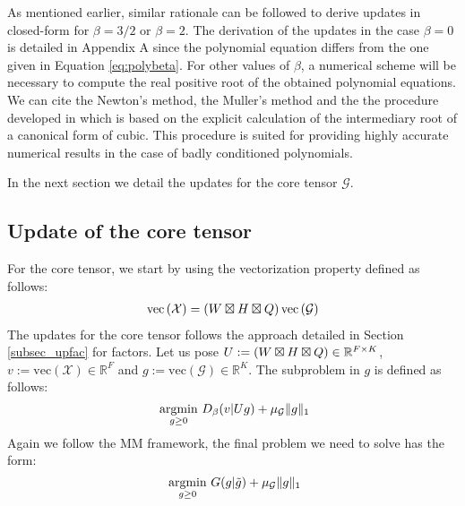 \documentclass[a4paper, 11pt]{article}
\begin{document}
As mentioned earlier, similar rationale can be followed to derive updates in closed-form for $\beta=3/2$ or $\beta=2$. 
The derivation of the updates in the case $\beta = 0$ is detailed in Appendix A since the polynomial equation differs from the one given in Equation \eqref{eq:polybeta}.
For other values of $\beta$, a numerical scheme will be necessary to compute the real positive root of the obtained polynomial equations. We can cite the Newton's method, the Muller's method and the the procedure developed in \cite{rootpoly} which is based on the explicit calculation of the intermediary root of a canonical form of cubic. This procedure is suited for providing highly accurate numerical results in the case of badly conditioned polynomials.


In the next section we detail the updates for the core tensor $\mathcal{G}$.

\subsection{Update of the core tensor}
For the core tensor, we start by using the vectorization property defined as follows:
\begin{equation}
    \begin{aligned}
       \text{vec}\left(\mathcal{X}\right)=\left(W \boxtimes H \boxtimes Q \right) \text{vec}\left(\mathcal{G}\right)
    \end{aligned}
\end{equation}
The updates for the core tensor follows the approach detailed in Section \ref{subsec_upfac} for factors. Let us pose $U:=\left(W \boxtimes H \boxtimes Q \right) \in \mathbb{R}^{F \times K}$, $v:=\text{vec}\left(\mathcal{X}\right) \in \mathbb{R}^{F}$  and $g:=\text{vec}\left(\mathcal{G}\right) \in \mathbb{R}^{K}$. The subproblem in $g$ is defined as follows:
\begin{equation}\label{eq:probinG}
  \underset{g \geq 0}{\mathop{\text{~argmin~}}}D_{\beta}(v|Ug) + \mu_{\mathcal{G}} \|g\|_1
\end{equation}
Again we follow the MM framework, the final problem we need to solve has the form:
\begin{equation}\label{eq:probinGupper}
  \underset{g \geq 0}{\mathop{\text{~argmin~}}}G(g|\tilde{g}) + \mu_{\mathcal{G}} \|g\|_1
\end{equation}
\end{document}
